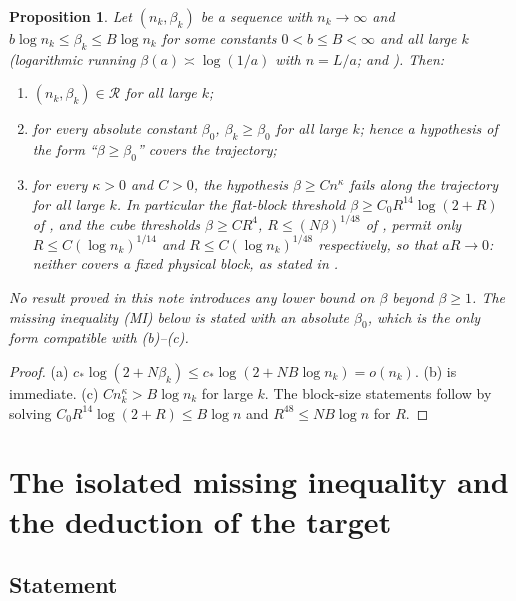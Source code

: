 \documentclass[11pt]{article}
\newtheorem{proposition}[theorem]{Proposition}
\theoremstyle{definition}
\begin{document}
\begin{proposition}\label{prop:trajectory}
Let $(n_k,\beta_k)$ be a sequence with $n_k\to\infty$ and $b\log n_k\le\beta_k\le B\log n_k$ for some constants
$0<b\le B<\infty$ and all large $k$ (logarithmic running $\beta(a)\asymp\log(1/a)$ with $n=L/a$; \cite[subsection ``Mesoscopic scales remain mesoscopic'']{rsc}
and \cite{stp}). Then:
\begin{enumerate}
\item[(a)] $(n_k,\beta_k)\in\mathcal R$ for all large $k$;
\item[(b)] for every absolute constant $\beta_0$, $\beta_k\ge\beta_0$ for all large $k$; hence a hypothesis of the form
``$\beta\ge\beta_0$'' covers the trajectory;
\item[(c)] for every $\kappa>0$ and $C>0$, the hypothesis $\beta\ge Cn^{\kappa}$ fails along the trajectory for all large
$k$. In particular the flat-block threshold $\beta\ge C_0R^{14}\log(2+R)$ of \cite[block theorem of Section~2]{spw},
and the cube thresholds $\beta\ge CR^4$, $R\le(N\beta)^{1/48}$ of \cite[geometry-regime display and theorem on the complete averaged internal error]{cub}, permit only
$R\le C(\log n_k)^{1/14}$ and $R\le C(\log n_k)^{1/48}$ respectively, so that $aR\to0$: neither covers a fixed
physical block, as stated in \cite[subsection ``Mesoscopic scales remain mesoscopic'']{rsc}.
\end{enumerate}
No result proved in this note introduces any lower bound on $\beta$ beyond $\beta\ge1$. The missing inequality
(MI) below is stated with an absolute $\beta_0$, which is the only form compatible with (b)--(c).
\end{proposition}
\begin{proof}
(a) $c_*\log(2+N\beta_k)\le c_*\log(2+NB\log n_k)=o(n_k)$. (b) is immediate. (c) $Cn_k^\kappa>B\log n_k$ for large $k$.
The block-size statements follow by solving $C_0R^{14}\log(2+R)\le B\log n$ and $R^{48}\le NB\log n$ for $R$.
\end{proof}

\section{The isolated missing inequality and the deduction of the target}\label{sec:missing}

\subsection{Statement}
\end{document}
